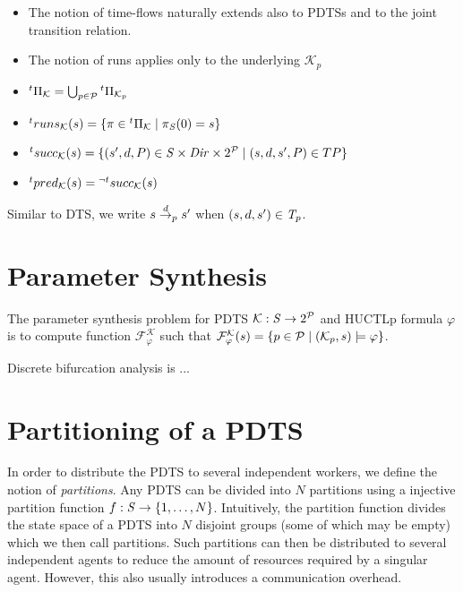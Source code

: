 \begin{itemize}
	\item The notion of time-flows naturally extends also to \acp{PDTS} and to the joint transition relation.
	\item The notion of runs applies only to the underlying $\mathcal{K}_p$
	\item ${}^{t}\Pi_\mathcal{K} = \bigcup_{p \in \mathcal{P}} {}^{t}\Pi_{\mathcal{K}_p}$
	\item ${}^{t}runs_\mathcal{K}(s) = \{ \pi \in {}^{t}\Pi_\mathcal{K} \mid \pi_{\mathit{S}}(0) = s \}$
	\item ${}^{t}succ_\mathcal{K}(s) = \{ (s', d, P) \in \mathit{S} \times \mathit{Dir} \times 2^{\mathcal{P}} \mid (s, d, s', P) \in TP \}$
	\item ${}^{t}pred_\mathcal{K}(s) = {}^{\neg t}succ_\mathcal{K}(s)$
\end{itemize}

Similar to \ac{DTS}, we write $s \stackrel{d}{\rightarrow}_p s'$ when $(s, d, s') \in \mathit{T}_p$. 

\section{Parameter Synthesis}

The parameter synthesis problem for \ac{PDTS} $\mathcal{K} : \mathit{S} \to 2^{\mathcal{P}}$ and \ac{HUCTLp} formula $\varphi$ is to compute function $\mathcal{F}^\mathcal{K}_\varphi$ such that $\mathcal{F}^\mathcal{K}_\varphi(s) = \{p \in \mathcal{P} \mid (\mathcal{K}_p, s) \models \varphi\}$.

Discrete bifurcation analysis is ...

\section{Partitioning of a \ac{PDTS}}

In order to distribute the \ac{PDTS} to several independent workers, we define the notion of \emph{partitions}. Any \ac{PDTS} can be divided into $N$ partitions using a injective partition function $f: \mathit{S} \to \{1, \ldots, N \}$. Intuitively, the partition function divides the state space of a \ac{PDTS} into $N$ disjoint groups (some of which may be empty) which we then call partitions. Such partitions can then be distributed to several independent agents to reduce the amount of resources required by a singular agent. However, this also usually introduces a communication overhead. 

